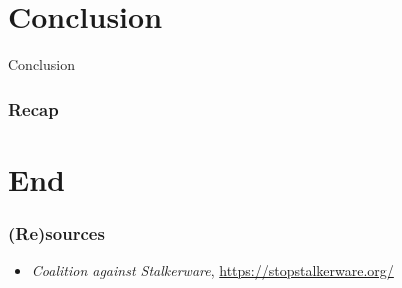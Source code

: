 \documentclass[aspectratio=169,x11names]{beamer}
\begin{document}

\section{Conclusion}
\begin{frame}
\begin{center}
\huge Conclusion
\end{center}
\end{frame}

\begin{frame}
\frametitle{Recap}
\end{frame}


\section{End}

\begin{frame}
\frametitle{(Re)sources}
\footnotesize

\begin{itemize}
\item \emph{Coalition against Stalkerware}, \url{https://stopstalkerware.org/}
\end{itemize}

\end{frame}
\end{document}
